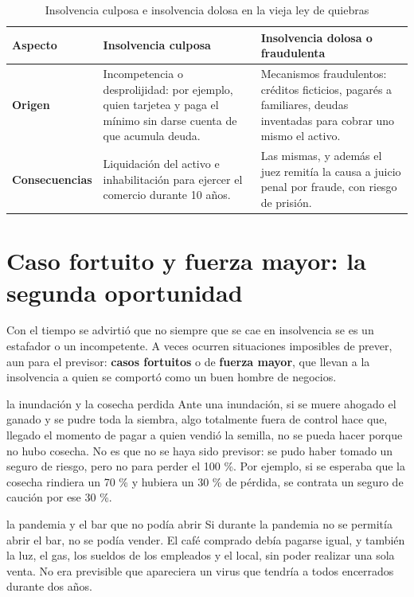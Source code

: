 \documentclass[12pt,oneside]{book}
\begin{document}
\begin{table}[H]
\centering
\caption{Insolvencia culposa e insolvencia dolosa en la vieja ley de quiebras}
\begin{tabularx}{\textwidth}{>{\raggedright\arraybackslash}p{} >{\raggedright\arraybackslash}X >{\raggedright\arraybackslash}X}
\toprule
\textbf{Aspecto} & \textbf{Insolvencia culposa} & \textbf{Insolvencia dolosa o fraudulenta} \\
\midrule
\textbf{Origen} & Incompetencia o desprolijidad: por ejemplo, quien tarjetea y paga el mínimo sin darse cuenta de que acumula deuda. & Mecanismos fraudulentos: créditos ficticios, pagarés a familiares, deudas inventadas para cobrar uno mismo el activo. \\
\textbf{Consecuencias} & Liquidación del activo e inhabilitación para ejercer el comercio durante 10 años. & Las mismas, y además el juez remitía la causa a juicio penal por fraude, con riesgo de prisión. \\
\bottomrule
\end{tabularx}
\end{table}

\section{Caso fortuito y fuerza mayor: la segunda oportunidad}

Con el tiempo se advirtió que no siempre que se cae en insolvencia se es un estafador o un incompetente. A veces ocurren situaciones imposibles de prever, aun para el previsor: \textbf{casos fortuitos} o de \textbf{fuerza mayor}, que llevan a la insolvencia a quien se comportó como un buen hombre de negocios.

\begin{example}{la inundación y la cosecha perdida}
Ante una inundación, si se muere ahogado el ganado y se pudre toda la siembra, algo totalmente fuera de control hace que, llegado el momento de pagar a quien vendió la semilla, no se pueda hacer porque no hubo cosecha. No es que no se haya sido previsor: se pudo haber tomado un seguro de riesgo, pero no para perder el 100 \%. Por ejemplo, si se esperaba que la cosecha rindiera un 70 \% y hubiera un 30 \% de pérdida, se contrata un seguro de caución por ese 30 \%.
\end{example}

\begin{example}{la pandemia y el bar que no podía abrir}
Si durante la pandemia no se permitía abrir el bar, no se podía vender. El café comprado debía pagarse igual, y también la luz, el gas, los sueldos de los empleados y el local, sin poder realizar una sola venta. No era previsible que apareciera un virus que tendría a todos encerrados durante dos años.
\end{example}
\end{document}
